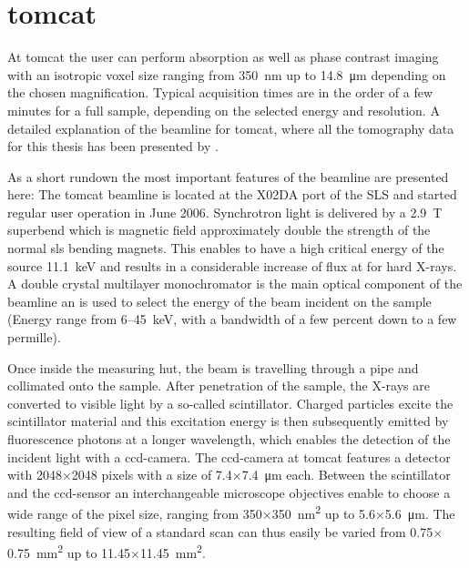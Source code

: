 \section{tomcat}\label{sec:tomcat}
At \acf{tomcat} the user can perform absorption as well as phase contrast imaging with an isotropic voxel size ranging from \SI{350}{\nano\meter} up to \SI{14.8}{\micro\meter} depending on the chosen magnification. Typical acquisition times are in the order of a few minutes for a full sample, depending on the selected energy and resolution. A detailed explanation of the beamline for \ac{tomcat}, where all the tomography data for this thesis has been presented by \citet{Stampanoni2006a}.

As a short rundown the most important features of the beamline are presented here: The \ac{tomcat} beamline is located at the X02DA port of the SLS and started regular user operation in June 2006. Synchrotron light is delivered by a \SI{2.9}{\tesla} superbend which is magnetic field approximately double the strength of the normal \ac{sls} bending magnets. This enables to have a high critical energy of the source \SI{11.1}{\kilo\electronvolt} and results in a considerable increase of flux at for hard X-rays. A double crystal multilayer monochromator is the main optical component of the beamline an is used to select the energy of the beam incident on the sample (Energy range from 6--\SI{45}{\kilo\electronvolt}, with a bandwidth of a few percent down to a few permille).

Once inside the measuring hut, the beam is travelling through a pipe and collimated onto the sample. After penetration of the sample, the X-rays are converted to visible light by a so-called scintillator. Charged particles excite the scintillator material and this excitation energy is then subsequently emitted by fluorescence photons at a longer wavelength, which enables the detection of the incident light with a \ac{ccd}-camera. The \ac{ccd}-camera at \ac{tomcat} features a detector with 2048$\times$2048 pixels with a size of 7.4$\times$\SI{7.4}{\micro\meter} each. Between the scintillator and the \ac{ccd}-sensor an interchangeable microscope objectives enable to choose a wide range of the pixel size, ranging from 350$\times$\SI{350}{\nano\meter\squared} up to 5.6$\times$\SI{5.6}{\micro\meter}. The resulting field of view of a standard scan can thus easily be varied from 0.75$\times$\SI{0.75}{\milli\meter\squared} up to 11.45$\times$\SI{11.45}{\milli\meter\squared}.

